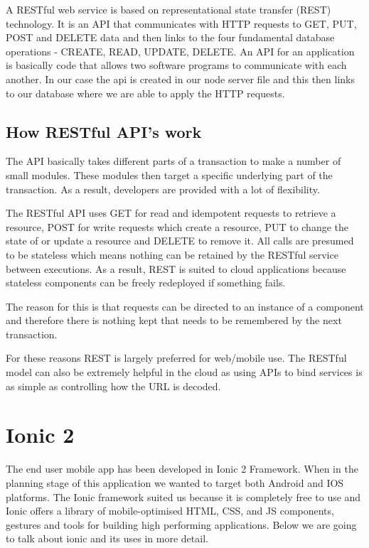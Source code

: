A RESTful web service is based on representational state transfer (REST) technology. It is an API that communicates with HTTP requests to GET, PUT, POST and DELETE data and then links to the four fundamental database operations - CREATE, READ, UPDATE, DELETE. An API for an application is basically code that allows two software programs to communicate with each another. In our case the api is created in our node server file and this then links to our database where we are able to apply the HTTP requests. 

\subsection {How RESTful API's work}

The API basically takes different parts of a transaction to make a number of small modules. These modules then target a specific underlying part of the transaction. As a result, developers are provided with a lot of flexibility.

The RESTful API uses GET for read and idempotent requests to retrieve a resource,  POST for write requests which create a resource, PUT to change the state of or update a resource and DELETE to remove it. All calls are presumed to be stateless which means nothing can be retained by the RESTful service between executions. As a result,  REST is suited to cloud applications because stateless components can be freely redeployed if something fails. \cite{RESTful}

The reason for this is that requests can be directed to an instance of a component and therefore there is nothing kept that needs to be remembered by the next transaction.

For these reasons REST is largely preferred for web/mobile use. The RESTful model can also be extremely helpful in the cloud as using APIs to bind services is as simple as controlling how the URL is decoded. 

\section{Ionic 2}

The end user mobile app has been developed in Ionic 2 Framework. When in the planning stage of this application we wanted to target both Android and IOS platforms. The Ionic framework suited us because it is completely free to use and Ionic offers a library of mobile-optimised HTML, CSS, and JS components, gestures and tools for building high performing applications. Below we are going to talk about ionic and its uses in more detail.


